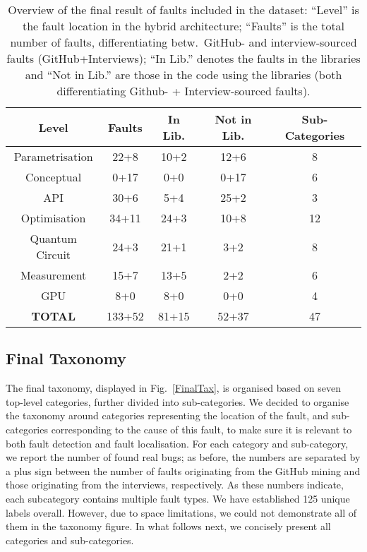 \begin{table}[hbt!]
    \centering
        \caption{Overview of the final result of faults included in the dataset: ``Level'' is the fault location in the hybrid architecture; ``Faults'' is the total number of faults, differentiating betw.\ GitHub- and interview-sourced faults   (GitHub+Interviews); ``In Lib.'' denotes the faults in the libraries and ``Not in Lib.'' are those in the code using the libraries (both differentiating Github- + Interview-sourced faults).  }
    \begin{tabular}{@{}c|c|c|c|c}   
    \hline
        \textbf{Level} & \textbf{Faults} & \textbf{In Lib.} & \textbf{Not in Lib.} & \textbf{Sub-Categories} \\
    \hline
      Parametrisation & 22+8  & 10+2 & 12+6 & 8 \\
      \hline
      Conceptual & 0+17 & 0+0 & 0+17 & 6\\
      \hline
      API & 30+6 & 5+4 & 25+2 & 3 \\
      \hline
      Optimisation & 34+11 & 24+3 & 10+8 & 12 \\
      \hline
      Quantum Circuit & 24+3 & 21+1 & 3+2 & 8 \\
      \hline
      Measurement & 15+7 & 13+5 & 2+2 & 6 \\
      \hline
      GPU & 8+0 & 8+0 & 0+0 & 4 \\
      \hline
      \textbf{TOTAL} & 133+52 & 81+15 & 52+37 & 47 \\
      \end{tabular}
    \label{tab:database}
\end{table}



\subsection{Final Taxonomy}
The final taxonomy, displayed in Fig.~\ref{FinalTax}, is organised based on seven top-level categories, further divided into sub-categories. We decided to organise the taxonomy around categories representing the location of the fault, and sub-categories corresponding to the cause of this fault, to make sure it is relevant to both fault detection and fault localisation.
For each category and sub-category, we report the number of found real bugs; as before, the numbers are separated by a plus sign between the number of faults originating from the GitHub mining and those originating from the interviews,  respectively. As these numbers indicate, each subcategory contains multiple fault types. We have established 125 unique labels overall. However, due to space limitations, we could not demonstrate all of them in the taxonomy figure. In what follows next, we concisely present all categories and sub-categories. 

